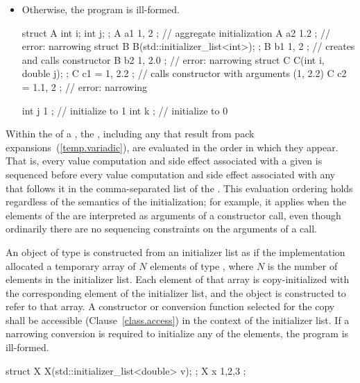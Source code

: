 \begin{itemize}
\item Otherwise, the program is ill-formed.

\enterexample
\begin{codeblock}
struct A { int i; int j; };
A a1 { 1, 2 };                      // aggregate initialization 
A a2 { 1.2 };                       // error: narrowing
struct B {
  B(std::initializer_list<int>);
};
B b1 { 1, 2 };                      // creates  and calls constructor
B b2 { 1, 2.0 };                    // error: narrowing
struct C {
  C(int i, double j);
};
C c1 = { 1, 2.2 };                  // calls constructor with arguments (1, 2.2) 
C c2 = { 1.1, 2 };                  // error: narrowing

int j { 1 };                        // initialize to 1
int k { };                          // initialize to 0
\end{codeblock}
\exitexample

\end{itemize}

\pnum
Within the  of a ,
the , including any that result from pack
expansions~(\ref{temp.variadic}), are evaluated in the order in which they
appear. That is, every value computation and side effect associated with a
given  is sequenced before every value
computation and side effect associated with any 
that follows it in the comma-separated list of the .
\enternote This evaluation ordering holds regardless of the semantics of the
initialization; for example, it applies when the elements of the
 are interpreted as arguments of a constructor
call, even though ordinarily there are no sequencing constraints on the
arguments of a call. \exitnote

\pnum
An object of type  is constructed from
an initializer list as if the implementation allocated a temporary array of $N$
elements of type , where $N$ is the number of elements in the
initializer list. Each element of that array is copy-initialized with the
corresponding element of the initializer list, and the
 object is constructed to refer to that array.
\enternote A constructor or conversion function selected for the copy shall be
accessible (Clause~\ref{class.access}) in the context of the initializer list.
\exitnote
If a narrowing conversion is required to initialize any of the elements, the program is ill-formed.\enterexample
\begin{codeblock}
struct X {
  X(std::initializer_list<double> v);
};
X x{ 1,2,3 };
\end{codeblock}

